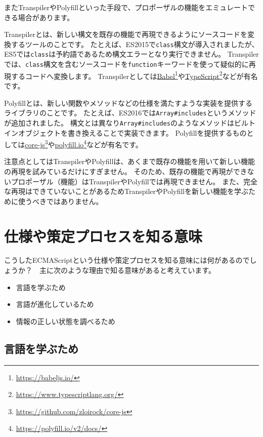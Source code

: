 またTranspilerやPolyfillといった手段で、プロポーザルの機能をエミュレートできる場合があります。

Transpilerとは、新しい構文を既存の機能で再現できるようにソースコードを変換するツールのことです。
たとえば、ES2015で\texttt{class}構文が導入されましたが、ES5では\texttt{class}は予約語であるため構文エラーとなり実行できません。
Transpilerでは、\texttt{class}構文を含むソースコードを\texttt{function}キーワードを使って疑似的に再現するコードへ変換します。
Transpilerとしては\href{https://babeljs.io/}{Babel}\footnote{\url{https://babeljs.io/}}や\href{https://www.typescriptlang.org/}{TypeScript}\footnote{\url{https://www.typescriptlang.org/}}などが有名です。

Polyfillとは、新しい関数やメソッドなどの仕様を満たすような実装を提供するライブラリのことです。
たとえば、ES2016では\texttt{Array\#includes}というメソッドが追加されました。
構文とは異なり\texttt{Array\#includes}のようなメソッドはビルトインオブジェクトを書き換えることで実装できます。
Polyfillを提供するものとしては\href{https://github.com/zloirock/core-js}{core-js}\footnote{\url{https://github.com/zloirock/core-js}}や\href{https://polyfill.io/v2/docs/}{polyfill.io}\footnote{\url{https://polyfill.io/v2/docs/}}などが有名です。

注意点としてはTranspilerやPolyfillは、あくまで既存の機能を用いて新しい機能の再現を試みているだけにすぎません。
そのため、既存の機能で再現ができないプロポーザル（機能）はTranspilerやPolyfillでは再現できません。
また、完全な再現はできていないことがあるためTranspilerやPolyfillを新しい機能を学ぶために使うべきではありません。

\hypertarget{meaning-specification-process}{%
\section{仕様や策定プロセスを知る意味}\label{meaning-specification-process}}

こうしたECMAScriptという仕様や策定プロセスを知る意味には何があるのでしょうか？　主に次のような理由で知る意味があると考えています。

\begin{itemize}
\item
  言語を学ぶため
\item
  言語が進化しているため
\item
  情報の正しい状態を調べるため
\end{itemize}

\hypertarget{to-learn}{%
\subsection{言語を学ぶため}\label{to-learn}}

